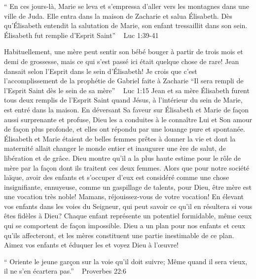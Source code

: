 

“ En ces jours-là, Marie se leva et s’empressa d’aller vers les montagnes dans une ville de Juda. Elle entra dans la maison de Zacharie et salua Élisabeth. Dès qu’Élisabeth entendit la salutation de Marie, son enfant tressaillit dans son sein. Élisabeth fut remplie d’Esprit Saint” ~ Luc 1:39-41

Habituellement, une mère peut sentir son bébé bouger à partir de trois mois et demi de grossesse, mais ce qui s'est passé ici était quelque chose de rare! Jean dansait selon l'Esprit dans le sein d'Élisabeth! Je crois que c'est l'accomplissement de la prophétie de Gabriel faite à Zacharie “Il sera rempli de l’Esprit Saint dès le sein de sa mère”
                                                                         ~ Luc 1:15
        Jean et sa mère Élisabeth furent tous deux remplis de l'Esprit Saint quand Jésus, à l'intérieur du sein de Marie, est entré dans la maison. En déversant Sa faveur sur Élisabeth et Marie de façon aussi surprenante et profuse, Dieu les a conduites à le connaître Lui et Son amour de façon plus profonde, et elles ont répondu par une louange pure et spontanée.
        Élisabeth et Marie étaient de belles femmes prêtes à donner la vie et dont la maternité allait changer le monde entier et inaugurer une ère de salut, de libération et de grâce. Dieu montre qu'il a la plus haute estime pour le rôle de mère par la façon dont ils traitent ces deux femmes. Alors que pour notre société laïque, avoir des enfants et s'occuper d'eux est considéré comme une chose insignifiante, ennuyeuse, comme un gaspillage de talents, pour Dieu, être mère est une vocation très noble!
        Mamans, réjouissez-vous de votre vocation! En élevant vos enfants dans les voies du Seigneur, qui peut savoir ce qu'il en résultera si vous êtes fidèles à Dieu? Chaque enfant représente un potentiel formidable, même ceux qui se comportent de façon impossible. Dieu a un plan pour nos enfants et ceux qu'ils affecteront, et les mères constituent une partie inestimable de ce plan. Aimez vos enfants et éduquer les et voyez Dieu à l'œuvre!

“ Oriente le jeune garçon sur la voie qu’il doit suivre; Même quand il sera vieux, il ne s’en écartera pas.” ~ Proverbes 22:6

